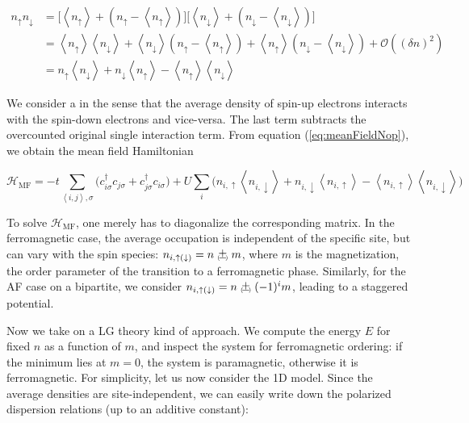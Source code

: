\begin{equation}\label{eq:meanFieldNop}
\begin{split}
n_\uparrow n_\downarrow &= \bigg[ \left\langle n_\uparrow \right\rangle + ( n_\uparrow - \left\langle n_\uparrow \right\rangle ) \bigg] \bigg[ \left\langle n_\downarrow \right\rangle + ( n_\downarrow - \left\langle n_\downarrow \right\rangle ) \bigg] \\
&= \left\langle n_\uparrow \right\rangle \left\langle n_\downarrow \right\rangle + \left\langle n_\downarrow \right\rangle ( n_\uparrow - \left\langle n_\uparrow \right\rangle ) + \left\langle n_\uparrow \right\rangle ( n_\downarrow - \left\langle n_\downarrow \right\rangle ) + \mathcal{O}((\delta n)^2) \\
&= n_\uparrow \left\langle n_\downarrow \right\rangle + n_\downarrow \left\langle n_\uparrow \right\rangle - \left\langle n_\uparrow \right\rangle \left\langle n_\downarrow \right\rangle
\end{split}
\end{equation}

We consider a  in the sense that the average density of spin-up electrons interacts with the spin-down electrons and vice-versa.
The last term subtracts the overcounted original single interaction term.
From equation (\ref{eq:meanFieldNop}), we obtain the mean field Hamiltonian

\begin{equation}
\mathcal{H}_{\text{MF}} = - t \sum_{\left\langle i, j \right\rangle, \sigma} \bigg( c_{i\sigma}^\dagger c_{j\sigma} + c_{j\sigma}^\dagger c_{i\sigma} \bigg) + U \sum_i \bigg( n_{i,\uparrow} \left\langle n_{i, \downarrow} \right\rangle + n_{i, \downarrow} \left\langle n_{i, \uparrow} \right\rangle - \left\langle n_{i, \uparrow} \right\rangle \left\langle n_{i, \downarrow} \right\rangle \bigg)
\end{equation}

To solve $\mathcal{H}_{\text{MF}}$, one merely has to diagonalize the corresponding matrix.
In the ferromagnetic case, the average occupation is independent of the specific site, but can vary with the spin species: $n_{i, \uparrow(\downarrow)} = n \Pm m$, where $m$ is the magnetization, the order parameter of the transition to a ferromagnetic phase.
Similarly, for the \acf{AF} case on a bipartite, we consider $n_{i, \uparrow(\downarrow)} = n \Pm (-1)^{i} m$, leading to a staggered potential.

Now we take on a \acl{LG} theory kind of approach.
We compute the energy $E$ for fixed $n$ as a function of $m$, and inspect the system for ferromagnetic ordering: if the minimum lies at $m = 0$, the system is paramagnetic, otherwise it is ferromagnetic.
For simplicity, let us now consider the \acs{1D} model.
Since the average densities are site-independent, we can easily write down the polarized dispersion relations (up to an additive constant):

